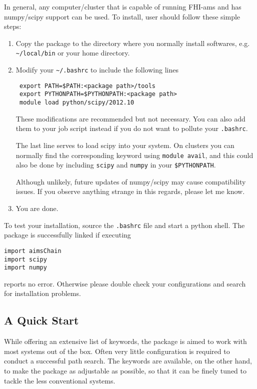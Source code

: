 In general, any computer/cluster that is capable of running FHI-ams and has numpy/scipy support can be used. 
To install, user should follow these simple steps:
\begin{enumerate}
\item Copy the package to the directory where you normally install softwares, e.g. \texttt{\textasciitilde /local/bin} or your home directory.
\item Modify your \texttt{\textasciitilde/.bashrc} to include the following lines 
\begin{verbatim}
 export PATH=$PATH:<package path>/tools
 export PYTHONPATH=$PYTHONPATH:<package path>
 module load python/scipy/2012.10
\end{verbatim}
These modifications are recommended but not necessary. You can also add them to your job script instead if you do not want to pollute your \texttt{.bashrc}.

The last line serves to load scipy into your system. On clusters you can normally find the corresponding keyword using \texttt{module avail}, and this could also be done by including \texttt{scipy} and \texttt{numpy} in your \texttt{\$PYTHONPATH}. 

Although unlikely, future updates of numpy/scipy may cause compatibility issues. If you observe anything strange in this regards, please let me know. 
\item You are done.
\end{enumerate}
To test your installation, source the \texttt{.bashrc} file and start a python shell. The package is successfully linked if executing
\begin{verbatim}
import aimsChain
import scipy
import numpy
\end{verbatim}
reports no error. Otherwise please double check your configurations and search for installation problems. 	

\subsection{A Quick Start}
While offering an extensive list of keywords, the package is aimed to work with most systems out of the box. Often very little configuration is required to conduct a successful path search. The keywords are available, on the other hand, to make the package as adjustable as possible, so that it can be finely tuned to tackle the less conventional systems. 

